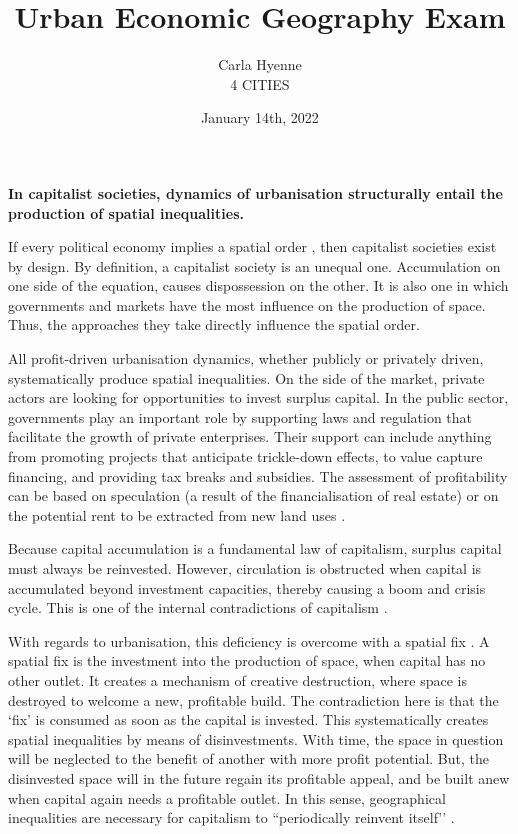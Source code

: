 \documentclass[12pt]{article}
\title{Urban Economic Geography Exam}
\author{Carla Hyenne\\[3ex]4 CITIES}
\date{January 14th, 2022}
\begin{document}
\maketitle

\pagebreak
\singlespacing

\textbf{In capitalist societies, dynamics of urbanisation structurally entail the production of spatial inequalities.}

If every political economy implies a spatial order \parencite{lefebvre2009state}, then capitalist societies exist by design. 
By definition, a capitalist society is an unequal one. Accumulation on one side of the equation, causes dispossession on the other.
It is also one in which governments and markets have the most influence on the production of space. Thus, the approaches they take directly influence the spatial order.

All profit-driven urbanisation dynamics, whether publicly or privately driven, systematically produce spatial inequalities. 
On the side of the market, private actors are looking for opportunities to invest surplus capital. In the public sector, governments play an important role by supporting laws and regulation that facilitate the growth of private enterprises. Their support can include anything from promoting projects that anticipate trickle-down effects, to value capture financing, and providing tax breaks and subsidies.
The assessment of profitability can be based on speculation (a result of the financialisation of real estate) or on the potential rent to be extracted from new land uses \parencite{smith1979toward}.

Because capital accumulation is a fundamental law of capitalism, surplus capital must always be reinvested. However, circulation is obstructed when capital is accumulated beyond investment capacities, thereby causing a boom and crisis cycle. This is one of the internal contradictions of capitalism \parencite{harvey2014seventeen}.

With regards to urbanisation, this deficiency is overcome with a spatial fix \parencite{harvey2001globalization}.
A spatial fix is the investment into the production of space, when capital has no other outlet. 
It creates a mechanism of creative destruction, where space is destroyed to welcome a new, profitable build.
The contradiction here is that the `fix' is consumed as soon as the capital is invested. This systematically creates spatial inequalities by means of disinvestments. With time, the space in question will be neglected to the benefit of another with more profit potential. But, the disinvested space will in the future regain its profitable appeal, and be built anew when capital again needs a profitable outlet.
In this sense, geographical inequalities are necessary for capitalism to ``periodically reinvent itself’’ \parencite[p.157]{harvey2014seventeen}.
\end{document}

